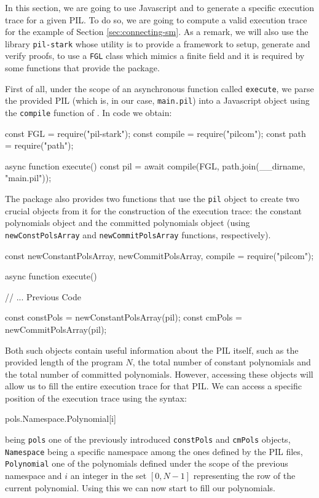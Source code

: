 In this section, we are going to use Javascript and \pilcom to generate a specific execution trace for a given PIL. To do so, we are going to compute a valid execution trace for the example of Section \ref{sec:connecting-sm}. As a remark, we will also use the library \texttt{pil-stark} whose utility is to provide a framework to setup, generate and verify proofs, to use a \texttt{FGL} class which mimics a finite field and it is required by some functions that provide the \pilcom package. 

First of all, under the scope of an asynchronous function called \texttt{execute}, we parse the provided PIL (which is, in our case, \texttt{main.pil}) into a Javascript object using the \texttt{compile} function of \pilcom. In code we obtain:
\begin{js}
const { FGL } = require("pil-stark");
const { compile } = require("pilcom");
const path = require("path");

async function execute() {
    const pil = await compile(FGL, path.join(__dirname, "main.pil"));
}
\end{js}

The \pilcom package also provides two functions that use the \texttt{pil} object to create two crucial objects from it for the construction of the execution trace: the constant polynomials object and the committed polynomials object (using \texttt{newConstPolsArray} and \texttt{newCommitPolsArray} functions, respectively).
\begin{js}
const { newConstantPolsArray, newCommitPolsArray, compile } = require("pilcom");

async function execute() {

    // ... Previous Code
    
    const constPols =  newConstantPolsArray(pil);
    const cmPols = newCommitPolsArray(pil);
}
\end{js}

Both such objects contain useful information about the PIL itself, such as the provided length of the program $N$, the total number of constant polynomials and the total number of committed polynomials. However, accessing these objects will allow us to fill the entire execution trace for that PIL. We can access a specific position of the execution trace using the syntax:
\begin{js}
pols.Namespace.Polynomial[i] 
\end{js}
being \texttt{pols} one of the previously introduced \texttt{constPols} and \texttt{cmPols} objects, \texttt{Namespace} being a specific namespace among the ones defined by the PIL files, \texttt{Polynomial} one of the polynomials defined under the scope of the previous namespace and $i$ an integer in the set $[0,N-1]$ representing the row of the current polynomial. Using this we can now start to fill our polynomials. 

